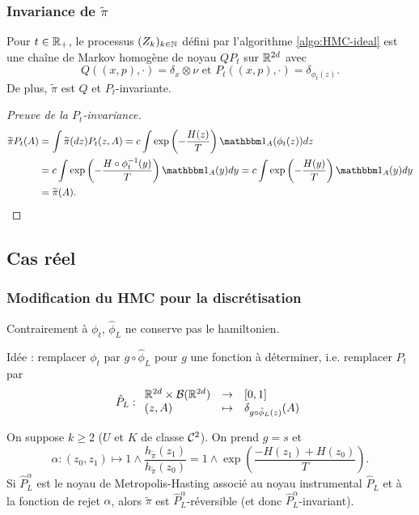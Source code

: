 \documentclass[10pt]{beamer}
\begin{document}
\begin{frame}
	\frametitle{Invariance de $\widetilde \pi$}
	\begin{Prop}
		Pour $t \in \mathbb{R}_+$, le processus $(Z_k)_{k \in \mathbb{N}}$ défini par l'algorithme \ref{algo:HMC-ideal} est une chaîne de Markov homogène de noyau $QP_t$ sur $\mathbb{R}^{2d}$ avec
		$$
		Q((x,p),\cdot) = \delta_x \otimes \nu \text{ et } P_t((x,p),\cdot) = \delta_{\phi_t(z)}.
		$$
		De plus, $\widetilde{\pi}$ est $Q$ et $P_t$-invariante. 
	\end{Prop}
	\begin{proof}[Preuve de la $P_t$-invariance]
		\small
		\begin{align*}
		\widetilde{\pi} P_t (A)
		&= \int \widetilde{\pi}(dz) P_t(z, A)
		= c \int \exp \left(-\frac{H(z)}{T} \right) \ind_A(\phi_t(z)) dz\\
		&= c \int \exp \left(-\frac{H \circ \phi_t^{-1}(y)}{T} \right) \ind_A(y) dy
		= c \int \exp \left(-\frac{H(y)}{T} \right) \ind_A(y) dy \\
		&= \widetilde{\pi}(A).
		\end{align*}
	\end{proof}
\end{frame}
 
\subsection{Cas réel}
 

\begin{frame}
	\frametitle{Modification du HMC pour la discrétisation}
	Contrairement à $\phi_t$, $\hat \phi_L$ ne conserve pas le hamiltonien.

	Idée : remplacer $\phi_t$ par $g \circ \hat \phi_L$ pour $g$ une fonction à déterminer, i.e. remplacer $P_t$ par
	$$
	\hat{P}_L : { \begin{array}{lcl} 
		\mathbb{R}^{2d} \times \mathcal{B}(\mathbb{R}^{2d}) & \to & [0,1] \\
		(z, A) & \mapsto & \delta_{g \circ \hat{\phi}_L(z)}(A)
	 \end{array} }
	$$


	\begin{Prop}[réversibilité]\label{prop:rever_discret}
		On suppose $k \geq 2$ ($U$ et $K$ de classe $\mathcal{C}^2$). On prend $g = s$ et
		$$
		\alpha : (z_0,z_1) \mapsto 1 \wedge \frac{h_{\widetilde \pi}(z_1)}{h_{\widetilde \pi}(z_0)} = 1 \wedge \exp(\frac{-H(z_1)+H(z_0)}{T}).
		$$
		Si $\hat P_L^\alpha$ est le noyau de Metropolis-Hasting associé au noyau instrumental $\hat P_L$ et à la fonction de rejet $\alpha$, alors $\widetilde \pi$ est $\hat P_L^\alpha$-réversible (et donc $\hat P_L^\alpha$-invariant).
	\end{Prop}
\end{frame}
\end{document}
